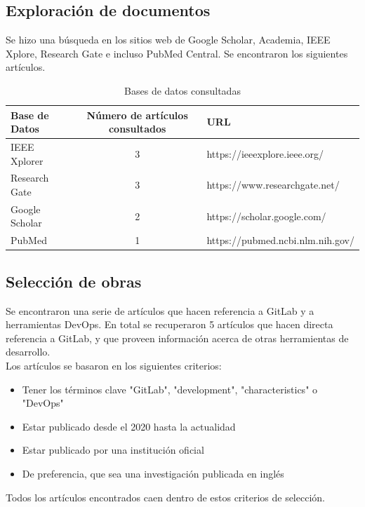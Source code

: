 \documentclass[runningheads]{llncs}
\begin{document}
\subsection{Exploración de documentos}
Se hizo una búsqueda en los sitios web de Google Scholar, Academia, IEEE Xplore, Research Gate e incluso PubMed Central.
Se encontraron los siguientes artículos.
\begin{table}[ht!]
        \centering
        \caption{Bases de datos consultadas}
        \begin{tabular}{l | c | l}
                Base de Datos & Número de artículos consultados & URL \\
                \hline
                \hline
                IEEE Xplorer & 3 & https://ieeexplore.ieee.org/ \\
                Research Gate & 3 & https://www.researchgate.net/ \\
                Google Scholar & 2 & https://scholar.google.com/ \\
                PubMed & 1 & https://pubmed.ncbi.nlm.nih.gov/ \\
                \hline
        \end{tabular}
        \label{table:1}
\end{table}
\subsection{Selección de obras}
Se encontraron una serie de artículos que hacen referencia a GitLab y a herramientas DevOps. En total se
recuperaron 5 artículos que hacen directa referencia a GitLab, y que proveen información acerca de otras
herramientas de desarrollo.\\
Los artículos se basaron en los siguientes criterios:
\begin{itemize}
        \item Tener los términos clave "GitLab", "development", "characteristics" o "DevOps"
        \item Estar publicado desde el 2020 hasta la actualidad
        \item Estar publicado por una institución oficial
        \item De preferencia, que sea una investigación publicada en inglés
\end{itemize}
Todos los artículos encontrados caen dentro de estos criterios de selección.
\end{document}
